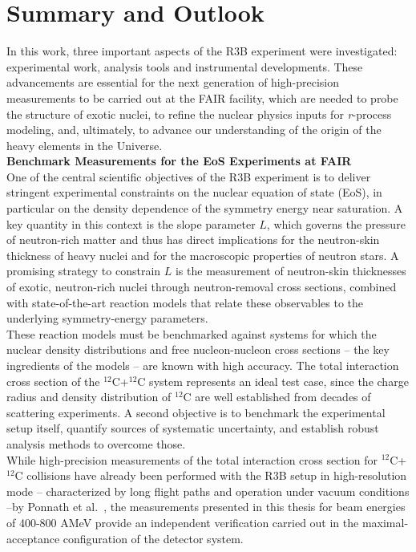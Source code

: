 \section{Summary and Outlook}
In this work, three important aspects of the R3B experiment were investigated: experimental work, analysis tools and instrumental developments. These advancements are essential for the next generation of high-precision measurements to be carried out at the FAIR facility, which are needed to probe the structure of exotic nuclei, to refine the nuclear physics inputs for \emph{r}-process modeling, and, ultimately, to advance our understanding of the origin of the heavy elements in the Universe.\\

\textbf{Benchmark Measurements for the EoS Experiments at FAIR}\\
One of the central scientific objectives of the R3B experiment is to deliver stringent experimental constraints on the nuclear equation of state (EoS), in particular on the density dependence of the symmetry energy near saturation. A key quantity in this context is the slope parameter $L$, which governs the pressure of neutron-rich matter and thus has direct implications for the neutron-skin thickness of heavy nuclei and for the macroscopic properties of neutron stars. A promising strategy to constrain $L$ is the measurement of neutron-skin thicknesses of exotic, neutron-rich nuclei through neutron-removal cross sections, combined with state-of-the-art reaction models that relate these observables to the underlying symmetry-energy parameters.\\
These reaction models must be benchmarked against systems for which the nuclear density distributions and free nucleon-nucleon cross sections -- the key ingredients of the models -- are known with high accuracy. The total interaction cross section of the $^{12}$C+$^{12}$C system represents an ideal test case, since the charge radius and density distribution of $^{12}$C are well established from decades of scattering experiments. A second objective is to benchmark the experimental setup itself, quantify sources of systematic uncertainty, and establish robust analysis methods to overcome those.\\
While high-precision measurements of the total interaction cross section for $^{12}$C+$^{12}$C collisions have already been performed with the R3B setup in high-resolution mode -- characterized by long flight paths and operation under vacuum conditions --by Ponnath et al.~\cite{ponnath2024measurement}, the measurements presented in this thesis for beam energies of 400-800 AMeV provide an independent verification carried out in the maximal-acceptance configuration of the detector system.
